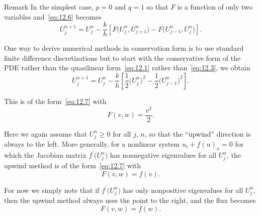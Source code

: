 \begin{frame}
    \frametitle{\secname}

    \begin{alertblock}{Remark}
        In the simplest case, $p=0$ and $q=1$ so that $F$ is a
        function of only two variables and~\eqref{eq:12.6} becomes
        \begin{equation}\tag{12.7}\label{eq:12.7}
            U^{n+1}_{j}=
            U^{n}_{j}-
            \frac{k}{h}
            \left[
                F
                \big(
                U^{n}_{j},
                U^{n}_{j+1}
                \big)-
                F
                \big(
                U^{n}_{j-1},
                U^{n}_{j}
                \big)
                \right].
        \end{equation}
    \end{alertblock}

    One way to derive numerical methods in conservation form is to
    use standard finite difference discretizations but to start with
    the conservative form of the PDE rather than the quasilinear
    form~\eqref{eq:12.1} rather than~\eqref{eq:12.3}, we obtain
    \begin{equation}\tag{12.11}\label{eq:12.11}
        U^{n+1}_{j}=
        U^{n}_{j}-
        \frac{k}{h}
        \left[
            \frac{1}{2}{\big(U^{n}_{j}\big)}^{2}-
            \frac{1}{2}{\big(U^{n}_{j-1}\big)}^{2}
            \right].
    \end{equation}

    This is of the form~\eqref{eq:12.7} with
    \begin{equation}\tag{12.12}\label{eq:12.12}
        F\left(v,w\right)=
        \frac{v^{2}}{2}.
    \end{equation}

    Here we again assume that $U^{n}_{j}\geq 0$ for all $j$, $n$, so
    that the ``upwind'' direction is always to the left.
    More generally, for a nonlinear system
    \begin{math}
        u_{t}+
        f\left(u\right)_{x}=
        0
    \end{math}
    for which the Jacobian matrix
    \begin{math}
        f^{\prime}
        \big(U^{n}_{j}\big)
    \end{math}
    has nonnegative eigenvalues
    for all $U^{n}_{j}$, the upwind method is of the
    form~\eqref{eq:12.7} with
    \begin{equation}\tag{12.13}\label{eq:12.13}
        F
        \left(v,w\right)=
        f
        \left(v\right).
    \end{equation}

    For now we simply note that if
    \begin{math}
        f^{\prime}
        \big(U^{n}_{j}\big)
    \end{math}
    has only nonpositive eigenvalues for all $U^{n}_{j}$, then the
    upwind method always uses the point to the right, and the flux
    becomes
    \begin{equation}\tag{12.14}\label{eq:12.14}
        F\left(v,w\right)=
        f\left(w\right).
    \end{equation}
\end{frame}

